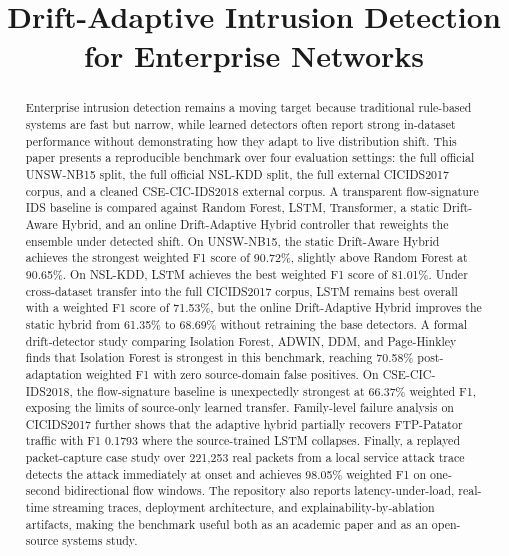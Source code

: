 \documentclass[conference]{IEEEtran}
\begin{document}
\title{Drift-Adaptive Intrusion Detection for Enterprise Networks}

\author{
}

\maketitle

\begin{abstract}
Enterprise intrusion detection remains a moving target because traditional rule-based systems are fast but narrow, while learned detectors often report strong in-dataset performance without demonstrating how they adapt to live distribution shift. This paper presents a reproducible benchmark over four evaluation settings: the full official UNSW-NB15 split, the full official NSL-KDD split, the full external CICIDS2017 corpus, and a cleaned CSE-CIC-IDS2018 external corpus. A transparent flow-signature IDS baseline is compared against Random Forest, LSTM, Transformer, a static Drift-Aware Hybrid, and an online Drift-Adaptive Hybrid controller that reweights the ensemble under detected shift. On UNSW-NB15, the static Drift-Aware Hybrid achieves the strongest weighted F1 score of 90.72\%, slightly above Random Forest at 90.65\%. On NSL-KDD, LSTM achieves the best weighted F1 score of 81.01\%. Under cross-dataset transfer into the full CICIDS2017 corpus, LSTM remains best overall with a weighted F1 score of 71.53\%, but the online Drift-Adaptive Hybrid improves the static hybrid from 61.35\% to 68.69\% without retraining the base detectors. A formal drift-detector study comparing Isolation Forest, ADWIN, DDM, and Page-Hinkley finds that Isolation Forest is strongest in this benchmark, reaching 70.58\% post-adaptation weighted F1 with zero source-domain false positives. On CSE-CIC-IDS2018, the flow-signature baseline is unexpectedly strongest at 66.37\% weighted F1, exposing the limits of source-only learned transfer. Family-level failure analysis on CICIDS2017 further shows that the adaptive hybrid partially recovers FTP-Patator traffic with F1 0.1793 where the source-trained LSTM collapses. Finally, a replayed packet-capture case study over 221{,}253 real packets from a local service attack trace detects the attack immediately at onset and achieves 98.05\% weighted F1 on one-second bidirectional flow windows. The repository also reports latency-under-load, real-time streaming traces, deployment architecture, and explainability-by-ablation artifacts, making the benchmark useful both as an academic paper and as an open-source systems study.
\end{abstract}
\end{document}
